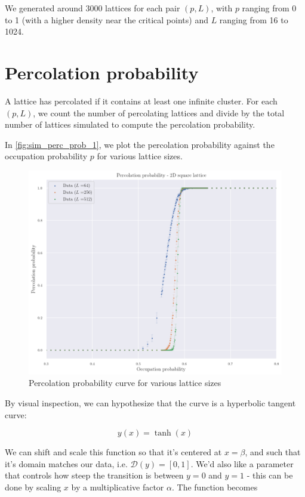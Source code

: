 We generated around 3000 lattices for each pair $(p, L)$, with $p$ ranging from 0 to 1 (with a higher density near the critical points) and $L$ ranging from 16 to 1024.


\section{Percolation probability}

A lattice has percolated if it contains at least one infinite cluster. For each $(p, L)$, we count the number of percolating lattices and divide by the total number of lattices simulated to compute the percolation probability.

In \autoref{fig:sim_perc_prob_1}, we plot the percolation probability against the occupation probability $p$ for various lattice sizes.


\begin{figure}[H]
  \includegraphics[width=\linewidth]{Images/sim_perc_prob_1.png}
  \caption{Percolation probability curve for various lattice sizes}
  \label{fig:sim_perc_prob_1}
\end{figure}

By visual inspection, we can hypothesize that the curve is a hyperbolic tangent curve: 

$$ 
y(x) = \tanh(x)
$$

We can shift and scale this function so that it's centered at $x=\beta$, and such that it's domain matches our data, i.e. $\mathcal{D}(y) = \left[ 0, 1 \right]$. We'd also like a parameter that controls how steep the transition is between $y=0$ and $y=1$ - this can be done by scaling $x$ by a multiplicative factor $\alpha$. The function becomes

